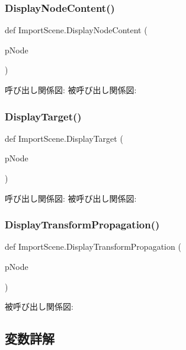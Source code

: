 \subsubsection{\texorpdfstring{Display\+Node\+Content()}{DisplayNodeContent()}}
{\footnotesize\ttfamily def Import\+Scene.\+Display\+Node\+Content (\begin{DoxyParamCaption}\item[{}]{p\+Node }\end{DoxyParamCaption})}

呼び出し関係図\+:
被呼び出し関係図\+:
\mbox{\label{namespace_import_scene_ab6985efc732c1079831ca9e90de52b14}} 
\subsubsection{\texorpdfstring{Display\+Target()}{DisplayTarget()}}
{\footnotesize\ttfamily def Import\+Scene.\+Display\+Target (\begin{DoxyParamCaption}\item[{}]{p\+Node }\end{DoxyParamCaption})}

呼び出し関係図\+:
被呼び出し関係図\+:
\mbox{\label{namespace_import_scene_a608e1906853a7d7966b39af7f7693b5d}} 
\subsubsection{\texorpdfstring{Display\+Transform\+Propagation()}{DisplayTransformPropagation()}}
{\footnotesize\ttfamily def Import\+Scene.\+Display\+Transform\+Propagation (\begin{DoxyParamCaption}\item[{}]{p\+Node }\end{DoxyParamCaption})}

被呼び出し関係図\+:


\subsection{変数詳解}
\mbox{\label{namespace_import_scene_a453e3ef1eabe39c820842ba18fca4a92}} 
